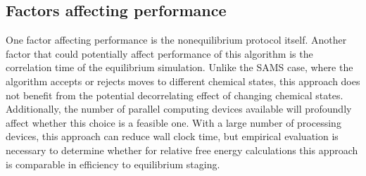\subsection{Factors affecting performance}
%
One factor affecting performance is the nonequilibrium protocol itself. 
%
Another factor that could potentially affect performance of this algorithm is the correlation time of the equilibrium simulation.
%
Unlike the SAMS case, where the algorithm accepts or rejects moves to different chemical states, this approach does not benefit from the potential decorrelating effect of changing chemical states.
%
Additionally, the number of parallel computing devices available will profoundly affect whether this choice is a feasible one.
%
With a large number of processing devices, this approach can reduce wall clock time, but empirical evaluation is necessary to determine whether for relative free energy calculations this approach is comparable in efficiency to equilibrium staging.